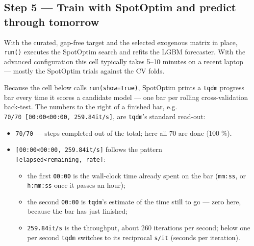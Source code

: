 \documentclass[
  english,
  letterpaper,
]{scrbook}
\providecommand{\tightlist}{%
  \setlength{\itemsep}{0pt}\setlength{\parskip}{0pt}}
\begin{document}
\subsection{Step 5 --- Train with SpotOptim and predict through
tomorrow}\label{sec-team4-run}

With the curated, gap-free target and the selected exogenous matrix in
place, \texttt{run()} executes the SpotOptim search and refits the LGBM
forecaster. With the advanced configuration this cell typically takes
5--10 minutes on a recent laptop --- mostly the SpotOptim trials against
the CV folds.

\begin{tcolorbox}[enhanced jigsaw, arc=.35mm, bottomrule=.15mm, bottomtitle=1mm, breakable, colback=white, colbacktitle=quarto-callout-note-color!10!white, colframe=quarto-callout-note-color-frame, coltitle=black, left=2mm, leftrule=.75mm, opacityback=0, opacitybacktitle=0.6, rightrule=.15mm, title=\textcolor{quarto-callout-note-color}{\faInfo}\hspace{0.5em}{Reading the SpotOptim progress bars}, titlerule=0mm, toprule=.15mm, toptitle=1mm]

Because the cell below calls \texttt{run(show=True)}, SpotOptim prints a
\texttt{tqdm} progress bar every time it scores a candidate model ---
one bar per rolling cross-validation back-test. The numbers to the right
of a finished bar, e.g.
\texttt{70/70\ {[}00:00\textless{}00:00,\ 259.84it/s{]}}, are
\texttt{tqdm}'s standard read-out:

\begin{itemize}
\tightlist
\item
  \texttt{70/70} --- steps completed out of the total; here all 70 are
  done (100 \%).
\item
  \texttt{{[}00:00\textless{}00:00,\ 259.84it/s{]}} follows the pattern
  \texttt{{[}elapsed\textless{}remaining,\ rate{]}}:

  \begin{itemize}
  \tightlist
  \item
    the first \texttt{00:00} is the wall-clock time already spent on the
    bar (\texttt{mm:ss}, or \texttt{h:mm:ss} once it passes an hour);
  \item
    the second \texttt{00:00} is \texttt{tqdm}'s estimate of the time
    still to go --- zero here, because the bar has just finished;
  \item
    \texttt{259.84it/s} is the throughput, about 260 iterations per
    second; below one per second \texttt{tqdm} switches to its
    reciprocal \texttt{s/it} (seconds per iteration).
  \end{itemize}
\end{itemize}


\end{tcolorbox}
\end{document}
